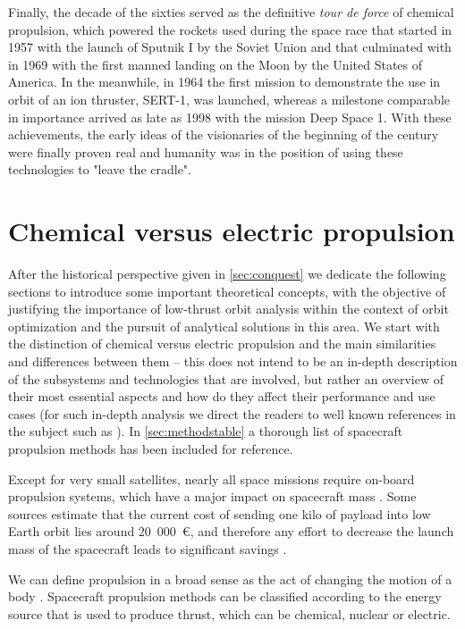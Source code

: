 Finally, the decade of the sixties served as the definitive \textit{tour de force} of chemical propulsion, which powered the rockets used during the space race that started in 1957 with the launch of Sputnik I by the Soviet Union and that culminated with in 1969 with the first manned landing on the Moon by the United States of America. In the meanwhile, in 1964 the first mission to demonstrate the use in orbit of an ion thruster, SERT-1, was launched, whereas a milestone comparable in importance arrived as late as 1998 with the mission Deep Space 1. With these achievements, the early ideas of the visionaries of the beginning of the century were finally proven real and humanity was in the position of using these technologies to "leave the cradle".

\section{Chemical versus electric propulsion} \label{sec:propulsion}

After the historical perspective given in \ref{sec:conquest} we dedicate the following sections to introduce some important theoretical concepts, with the objective of justifying the importance of low-thrust orbit analysis within the context of orbit optimization and the pursuit of analytical solutions in this area. We start with the distinction of chemical versus electric propulsion and the main similarities and differences between them -- this does not intend to be an in-depth description of the subsystems and technologies that are involved, but rather an overview of their most essential aspects and how do they affect their performance and use cases (for such in-depth analysis we direct the readers to well known references in the subject such as \cite{sutton2016rocket}). In \ref{sec:methodstable} a thorough list of spacecraft propulsion methods has been included for reference.

Except for very small satellites, nearly all space missions require on-board propulsion systems, which have a major impact on spacecraft mass \cite{curran1993nasa}. Some sources estimate that the current cost of sending one kilo of payload into low Earth orbit lies around 20~000~€, and therefore any effort to decrease the launch mass of the spacecraft leads to significant savings \cite{choueiri2009new}.

We can define propulsion in a broad sense as the act of changing the motion of a body \cite{sutton2016rocket}. Spacecraft propulsion methods can be classified according to the energy source that is used to produce thrust, which can be chemical, nuclear or electric.

